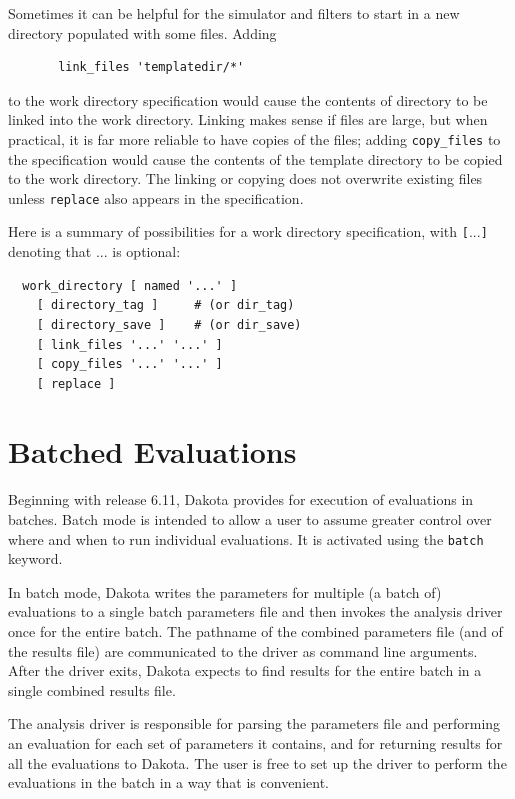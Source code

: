 Sometimes it can be helpful for the simulator and filters to start in a
new directory populated with some files.  Adding
\begin{small}
\begin{verbatim}
       link_files 'templatedir/*'
\end{verbatim}
\end{small}
to the work directory specification would cause the
contents of directory  to be linked
into the work directory.  Linking makes sense if files are large,
but when practical, it is far more reliable to have
copies of the files; adding \texttt{copy\_files} to the specification
would cause the contents of the template directory to be copied
to the work directory.  The linking or copying does
not overwrite existing files unless \texttt{replace} also appears
in the specification.

Here is a summary of possibilities for a work directory specification,
with {\tt\verb=[=$...$\verb=]=} denoting that $...$ is optional:
\begin{small}
\begin{verbatim}
  work_directory [ named '...' ]
    [ directory_tag ]     # (or dir_tag)
    [ directory_save ]    # (or dir_save)
    [ link_files '...' '...' ]
    [ copy_files '...' '...' ]
    [ replace ]
\end{verbatim}
\end{small}

\section{Batched Evaluations}\label{interfaces:batch}

Beginning with release 6.11, Dakota provides for execution of
evaluations in batches. Batch mode is intended to allow a user
to assume greater control over where and when to run individual
evaluations. It is activated using the \texttt{batch} keyword.

In batch mode, Dakota writes the parameters for multiple (a batch of)
evaluations to a single batch parameters file and then invokes the
analysis driver once for the entire batch. The pathname of the
combined parameters file (and of the results file) are communicated
to the driver as command line arguments. After the driver exits, Dakota
expects to find results for the entire batch in a single combined results
file.

The analysis driver is responsible for parsing the parameters file
and performing an evaluation for each set of parameters it contains,
and for returning results for all the evaluations to Dakota. The user
is free to set up the driver to perform the evaluations in the batch in
a way that is convenient.

